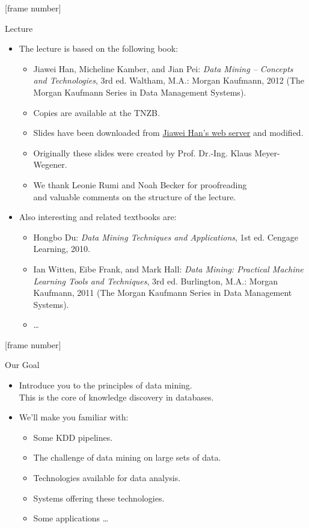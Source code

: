 \documentclass[aspectratio=169,t]{beamer}
\begin{document}
{ %
	[frame number]
	\begin{frame}{Lecture}
		\begin{itemize}
			\item The lecture is based on the following book:
			      \begin{itemize}
				      \item Jiawei Han, Micheline Kamber, and Jian Pei: \emph{Data Mining – Concepts and Technologies}, 3rd ed. Waltham, M.A.: Morgan Kaufmann, 2012 (The Morgan Kaufmann Series in Data Management Systems).
				      \item \small{Copies are available at the TNZB.}
				      \item \small{Slides have been downloaded from \href{http://hanj.cs.illinois.edu/}{Jiawei Han's web server} and modified.}
              \item \small{Originally these slides were created by Prof. Dr.-Ing. Klaus Meyer-Wegener.}
              \item \small{We thank Leonie Rumi and Noah Becker for proofreading \\
              and valuable comments on the structure of the lecture.}
			      \end{itemize}
			\item Also interesting and related textbooks are:
			      \begin{itemize}
				      \item Hongbo Du: \emph{Data Mining Techniques and Applications}, 1st ed. Cengage Learning, 2010.
				      \item Ian Witten, Eibe Frank, and Mark Hall: \emph{Data Mining: Practical Machine Learning Tools and Techniques}, 3rd ed. Burlington, M.A.: Morgan Kaufmann, 2011 (The Morgan Kaufmann Series in Data Management Systems).
				      \item \ldots
			      \end{itemize}
		\end{itemize}
	\end{frame}
}

{ %
	[frame number]
	\begin{frame}{Our Goal}
		\begin{itemize}
			\item Introduce you to the principles of data mining. \\ This is the core of knowledge discovery in databases.
			\item We'll make you familiar with:
			      \begin{itemize}
				      \item Some KDD pipelines.
				      \item The challenge of data mining on large sets of data.
				      \item Technologies available for data analysis.
				      \item Systems offering these technologies.
				      \item Some applications \ldots
			      \end{itemize}
		\end{itemize}
	\end{frame}
}
\end{document}
